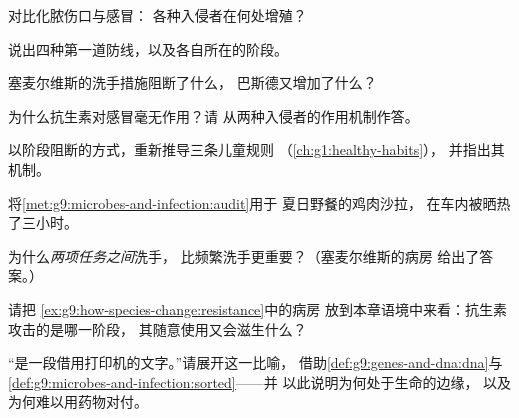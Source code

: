 \begin{exercise}[$\star$]\label{exo:g9:microbes-and-infection:4}
对比化脓伤口与感冒：
各种入侵者在何处增殖？
\end{exercise}

\begin{exercise}[$\star$]\label{exo:g9:microbes-and-infection:5}
说出四种第一道防线，以及各自所在的阶段。
\end{exercise}

\begin{exercise}[$\star$]\label{exo:g9:microbes-and-infection:6}
塞麦尔维斯的洗手措施阻断了什么，
巴斯德又增加了什么？
\end{exercise}

\begin{exercise}[$\star\star$]\label{exo:g9:microbes-and-infection:7}
为什么抗生素对感冒毫无作用？请
从两种入侵者的作用机制作答。
\end{exercise}

\begin{exercise}[$\star\star$]\label{exo:g9:microbes-and-infection:8}
以阶段阻断的方式，重新推导三条儿童规则
（\cref{ch:g1:healthy-habits}），
并指出其机制。
\end{exercise}

\begin{exercise}[$\star\star$]\label{exo:g9:microbes-and-infection:9}
将\cref{met:g9:microbes-and-infection:audit}用于
夏日野餐的鸡肉沙拉，
在车内被晒热了三小时。
\end{exercise}

\begin{exercise}[$\star\star$]\label{exo:g9:microbes-and-infection:10}
为什么\emph{两项任务之间}洗手，
比频繁洗手更重要？（塞麦尔维斯的病房
给出了答案。）
\end{exercise}

\begin{exercise}[$\star\star$]\label{exo:g9:microbes-and-infection:11}
请把
\cref{ex:g9:how-species-change:resistance}中的病房
放到本章语境中来看：抗生素攻击的是哪一阶段，
其随意使用又会滋生什么？
\end{exercise}

\begin{exercise}[$\star\star\star$]\label{exo:g9:microbes-and-infection:12}
“是一段借用打印机的文字。”请展开这一比喻，
借助\cref{def:g9:genes-and-dna:dna}与
\cref{def:g9:microbes-and-infection:sorted}——并
以此说明为何处于生命的边缘，
以及为何难以用药物对付。
\end{exercise}

